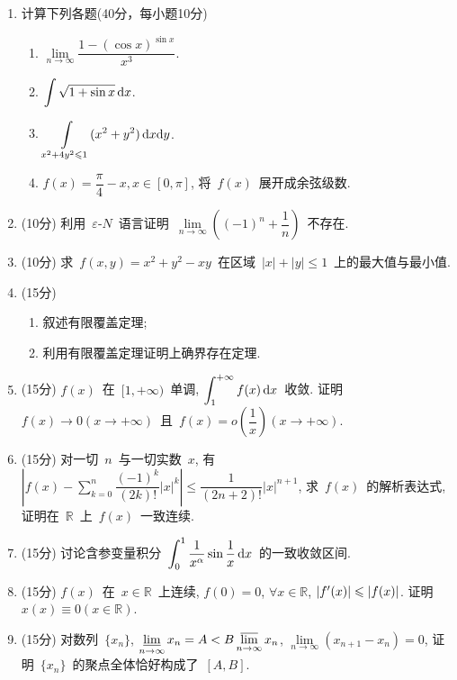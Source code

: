 \documentclass[UTF8,a4paper,11pt]{article}
\begin{document}
\begin{enumerate}
	\item 计算下列各题(40分，每小题10分)
	      \begin{enumerate}
		      \item $\lim\limits_{n\to\infty}\dfrac{1-(\cos{x})^{\sin{x}}}{x^3}$.
		            \vspace{2em}
		      \item $\displaystyle\int\sqrt{1+\sin{x}}\,\mathrm{d}x$.
		            \vspace{2em}
		      \item $\displaystyle\int\limits_{x^2+4y^2\leqslant 1} (x^2+y^2)\,\mathrm{d}x\mathrm{d}y$.
		            \vspace{2em}
		      \item $f(x)=\dfrac{\pi}{4}-x, x\in[0,\pi]$, 将~$f(x)$~展开成余弦级数.
		            \vspace{2em}
	      \end{enumerate}
	\item (10分) 利用~$\varepsilon$-$N$~语言证明~$\lim\limits_{n\to\infty}\left((-1)^n+\dfrac{1}{n}\right)$~不存在.
	      \vspace{2em}
	\item (10分) 求~$f(x,y)=x^2+y^2-xy$~在区域~$|x|+|y|\leqslant 1$~上的最大值与最小值.
	      \vspace{2em}
	\item (15分)
	      \begin{enumerate}
		      \item 叙述有限覆盖定理;
		      \item 利用有限覆盖定理证明上确界存在定理.
	      \end{enumerate}
	      \vspace{2em}
	\item (15分) $f(x)$~在~$[1,+\infty)$~单调, $\displaystyle\int_1^{+\infty} f(x)\,\mathrm{d}x$~收敛. 证明~$f(x)\to 0(x\to+\infty)$~且~$f(x)=o(\dfrac{1}{x})(x\to+\infty)$.
	      \vspace{2em}
	\item (15分) 对一切~$n$~与一切实数~$x$, 有~$\left|f(x)-\sum\limits_{k=0}^n\dfrac{(-1)^k}{(2k)!}|x|^k\right|\leqslant\dfrac{1}{(2n+2)!}|x|^{n+1}$, 求~$f(x)$~的解析表达式, 证明在~$\mathbb{R}$~上~$f(x)$~一致连续.
	      \vspace{2em}
	\item (15分) 讨论含参变量积分~$\displaystyle\int_0^1 \dfrac{1}{x^{\alpha}}\sin{\dfrac{1}{x}}\,\mathrm{d}x$~的一致收敛区间.
	      \vspace{2em}
	\item (15分) $f(x)$~在~$x\in\mathbb{R}$~上连续, $f(0)=0$, $\forall x\in\mathbb{R}$, $|f\rq{}(x)|\leqslant|f(x)|$. 证明~$x(x)\equiv 0(x\in\mathbb{R})$.
	      \vspace{2em}
	\item (15分) 对数列~$\{x_n\}$, $\varliminf\limits_{n\to\infty}x_n=A<B\varlimsup\limits_{n\to\infty} x_n$, $\lim\limits_{n\to\infty} (x_{n+1}-x_n)=0$, 证明~$\{x_n\}$~的聚点全体恰好构成了~$[A,B]$.
	      \vspace{2em}
\end{enumerate}
\end{document}
